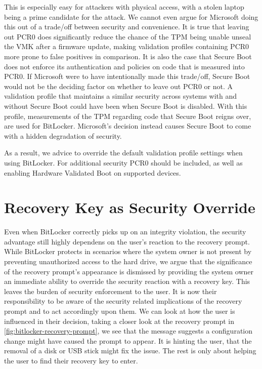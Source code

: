 This is especially easy for attackers with physical access, with a stolen laptop being a prime candidate for the attack.
We cannot even argue for Microsoft doing this out of a trade\-/off between security and convenience.
It is true that leaving out \ac{PCR}0 does significantly reduce the chance of the \ac{TPM} being unable unseal the \ac{VMK} after a firmware update, making validation profiles containing \ac{PCR}0 more prone to false positives in comparison.
It is also the case that Secure Boot does not enforce its authentication and policies on code that is measured into \ac{PCR}0.
If Microsoft were to have intentionally made this trade\-/off, Secure Boot would not be the deciding factor on whether to leave out \ac{PCR}0 or not.
A validation profile that maintains a similar security across systems with and without Secure Boot could have been \hyperref[tab:pcr-usage]{} when Secure Boot is disabled.
With this profile, measurements of the \ac{TPM} regarding code that Secure Boot reigns over, are used for BitLocker.
Microsoft's decision instead causes Secure Boot to come with a hidden degradation of security.

As a result, we advice to override the default validation profile settings when using BitLocker.
For additional security \ac{PCR}0 should be included, as well as enabling Hardware Validated Boot on supported devices.


\section{Recovery Key as Security Override}

Even when BitLocker correctly picks up on an integrity violation, the security advantage still highly dependens on the user's reaction to the recovery prompt.
While BitLocker protects in scenarios where the system owner is not present by preventing unauthorized access to the hard drive, we argue that the significance of the recovery prompt's appearance is dismissed by providing the system owner an immediate ability to override the security reaction with a recovery key.
This leaves the burden of security enforcement to the user.
It is now their responsibility to be aware of the security related implications of the recovery prompt and to act accordingly upon them.
We can look at how the user is influenced in their decision, taking a closer look at the recovery prompt in \autoref{fig:bitlocker-recovery-prompt}, we see that the message suggests a configuration change might have caused the prompt to appear.
It is hinting the user, that the removal of a disk or \ac{USB} stick might fix the issue.
The rest is only about helping the user to find their recovery key to enter.

